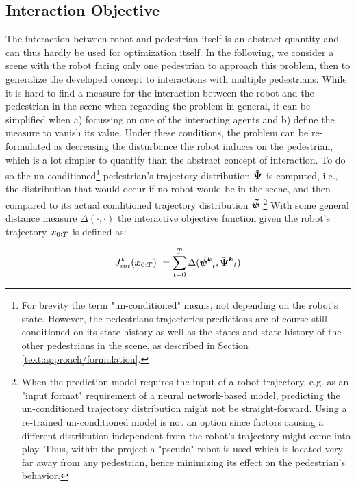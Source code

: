 \subsection{Interaction Objective}
\label{text:approach/objective/interactive}
The interaction between robot and pedestrian itself is an abstract quantity and can thus hardly be used for optimization itself. In the following, we consider a scene with the robot facing only one pedestrian to approach this problem, then to generalize the developed concept to interactions with multiple pedestrians.  
\newline
While it is hard to find a measure for the interaction between the robot and the pedestrian in the scene when regarding the problem in general, it can be simplified when a) focussing on one of the interacting agents and b) define the measure to vanish its value. Under these conditions, the problem can be re-formulated as decreasing the disturbance the robot induces on the pedestrian, which is a lot simpler to quantify than the abstract concept of interaction. To do so the un-conditioned\footnote{For brevity the term "un-conditioned" means, not depending on the robot's state. However, the pedestrians trajectories predictions are of course still conditioned on its state history as well as the states and state history of the other pedestrians in the scene, as described in Section \ref{text:approach/formulation}.} pedestrian's trajectory distribution $\distwo[]$ is computed, i.e., the distribution that would occur if no robot would be in the scene, and then compared to its actual conditioned trajectory distribution $\dist[]$.\footnote{When the prediction model requires the input of a robot trajectory, e.g. as an "input format" requirement of a neural network-based model, predicting the un-conditioned trajectory distribution might not be straight-forward. Using a re-trained un-conditioned model is not an option since factors causing a different distribution independent from the robot's trajectory might come into play. Thus, within the project a "pseudo"-robot is used which is located very far away from any pedestrian, hence minimizing its effect on the pedestrian's behavior.} With some general distance measure $\Delta(\cdot, \cdot)$ the interactive objective function given the robot's trajectory $\boldsymbol{x}_{0:T}$ is defined as:

\begin{equation}
J_{int}^k(\x_{0:T}) = \sum_{t=0}^T \Delta(\dist[k]_t, \distwo[k]_t)
\label{eq:objective_interaction}
\end{equation}

